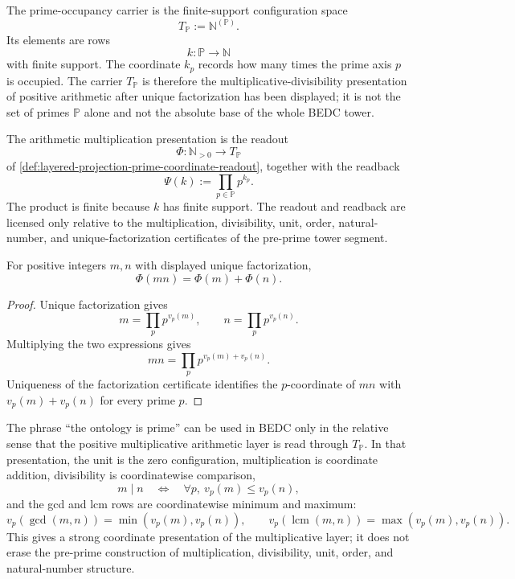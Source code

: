 \begin{definition}
\label{def:layered-projection-prime-occupancy-carrier}
The prime-occupancy carrier is the finite-support configuration space
$$
T_{\mathbb P}:=\mathbb N^{(\mathbb P)}.
$$
Its elements are rows
$$
k:\mathbb P\to\mathbb N
$$
with finite support. The coordinate $k_p$ records how many times the
prime axis $p$ is occupied. The carrier $T_{\mathbb P}$ is therefore the
multiplicative-divisibility presentation of positive arithmetic after
unique factorization has been displayed; it is not the set of primes
$\mathbb P$ alone and not the absolute base of the whole BEDC tower.
\end{definition}

\begin{definition}
\label{def:layered-projection-arithmetic-multiplication-presentation}
The arithmetic multiplication presentation is the readout
$$
\Phi:\mathbb N_{>0}\to T_{\mathbb P}
$$
of \autoref{def:layered-projection-prime-coordinate-readout}, together
with the readback
$$
\Psi(k):=\prod_{p\in\mathbb P}p^{k_p}.
$$
The product is finite because $k$ has finite support. The readout and
readback are licensed only relative to the multiplication, divisibility,
unit, order, natural-number, and unique-factorization certificates of
the pre-prime tower segment.
\end{definition}

\begin{theorem}
\label{thm:layered-projection-multiplication-coordinate-addition}
For positive integers $m,n$ with displayed unique factorization,
$$
\Phi(mn)=\Phi(m)+\Phi(n).
$$
\end{theorem}

\begin{proof}
Unique factorization gives
$$
m=\prod_p p^{v_p(m)},
\qquad
n=\prod_p p^{v_p(n)}.
$$
Multiplying the two expressions gives
$$
mn=\prod_p p^{v_p(m)+v_p(n)}.
$$
Uniqueness of the factorization certificate identifies the $p$-coordinate
of $mn$ with $v_p(m)+v_p(n)$ for every prime $p$.
\end{proof}

\begin{principle}
\label{prin:layered-projection-prime-ontology-relative}
The phrase ``the ontology is prime'' can be used in BEDC only in the
relative sense that the positive multiplicative arithmetic layer is read
through $T_{\mathbb P}$. In that presentation, the unit is the zero
configuration, multiplication is coordinate addition, divisibility is
coordinatewise comparison,
$$
m\mid n
\quad\Longleftrightarrow\quad
\forall p,\ v_p(m)\leq v_p(n),
$$
and the gcd and lcm rows are coordinatewise minimum and maximum:
$$
v_p(\gcd(m,n))=\min(v_p(m),v_p(n)),
\qquad
v_p(\operatorname{lcm}(m,n))=\max(v_p(m),v_p(n)).
$$
This gives a strong coordinate presentation of the multiplicative layer;
it does not erase the pre-prime construction of multiplication,
divisibility, unit, order, and natural-number structure.
\end{principle}

